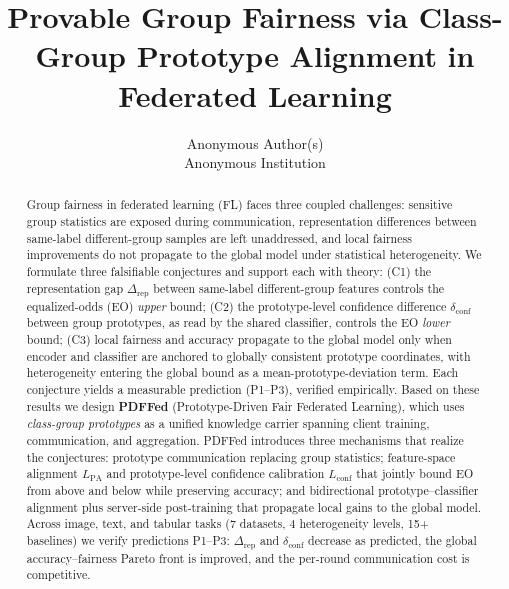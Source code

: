 \documentclass{article}
\title{Provable Group Fairness via Class-Group Prototype Alignment in Federated Learning}
\author{Anonymous Author(s) \\ Anonymous Institution}
\date{}
\newcommand{\rep}{\Delta_{\mathrm{rep}}}
\begin{document}
\maketitle

\begin{abstract}
Group fairness in federated learning (FL) faces three coupled challenges:
sensitive group statistics are exposed during communication, representation
differences between same-label different-group samples are left unaddressed,
and local fairness improvements do not propagate to the global model under
statistical heterogeneity. We formulate three falsifiable conjectures and
support each with theory: (C1) the representation gap $\rep$ between
same-label different-group features controls the equalized-odds (EO)
\emph{upper} bound; (C2) the prototype-level confidence difference
$\delta_{\mathrm{conf}}$ between group prototypes, as read by the shared
classifier, controls the EO \emph{lower} bound; (C3) local fairness and
accuracy propagate to the global model only when encoder and classifier are
anchored to globally consistent prototype coordinates, with heterogeneity
entering the global bound as a mean-prototype-deviation term. Each conjecture
yields a measurable prediction (P1--P3), verified empirically. Based on these
results we design \textbf{PDFFed} (Prototype-Driven Fair Federated
Learning), which uses \emph{class-group prototypes} as a unified knowledge
carrier spanning client training, communication, and aggregation. PDFFed
introduces three mechanisms that realize the conjectures: prototype
communication replacing group statistics; feature-space alignment
$L_{\mathrm{PA}}$ and prototype-level confidence calibration $L_{\mathrm{conf}}$
that jointly bound EO from above and below while preserving accuracy; and
bidirectional prototype--classifier alignment plus server-side post-training
that propagate local gains to the global model. Across image, text, and
tabular tasks (7 datasets, 4 heterogeneity levels, 15+ baselines) we verify
predictions P1--P3: $\rep$ and $\delta_{\mathrm{conf}}$ decrease as
predicted, the global accuracy--fairness Pareto front is improved, and the
per-round communication cost is competitive.
\end{abstract}

\end{document}
